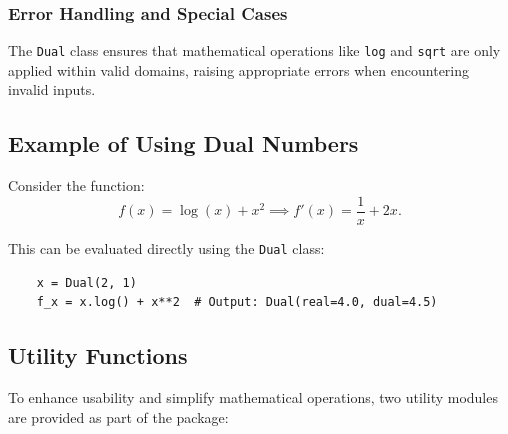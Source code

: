 \documentclass[a4paper,12pt]{article}
\begin{document}
    \subsubsection{Error Handling and Special Cases}
    The \texttt{Dual} class ensures that mathematical operations like \texttt{log} and \texttt{sqrt} are only applied within valid domains, raising appropriate errors when encountering invalid inputs.
    
    \subsection{Example of Using Dual Numbers}
    Consider the function:
    \begin{equation}
        f(x) = \log(x) + x^2 \implies f'(x) = \frac{1}{x} + 2x.
        \label{eq:derivative_example}
    \end{equation}
    
    This can be evaluated directly using the \texttt{Dual} class:
    \begin{verbatim}
    x = Dual(2, 1)
    f_x = x.log() + x**2  # Output: Dual(real=4.0, dual=4.5)
    \end{verbatim}
    
    \subsection{Utility Functions}
    
    To enhance usability and simplify mathematical operations, two utility modules are provided as part of the package:
    
\end{document}
